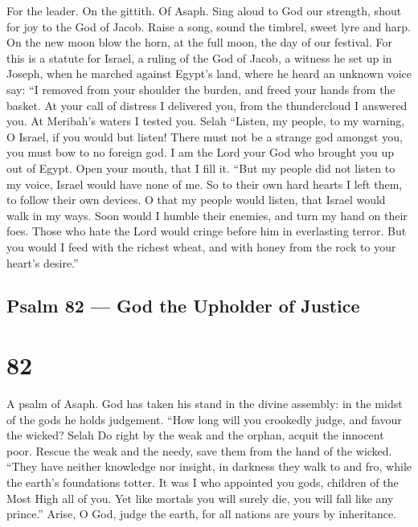 For the leader. On the gittith. Of Asaph.  Sing aloud to God
our strength, shout for joy to the God of Jacob.  Raise a
song, sound the timbrel, sweet lyre and harp.  On the new
moon blow the horn, at the full moon, the day of our festival.
 For this is a statute for Israel, a ruling of the God of
Jacob,  a witness he set up in Joseph, when he marched
against Egypt's land, where he heard an unknown voice say: 
``I removed from your shoulder the burden, and freed your hands from the
basket.  At your call of distress I delivered you, from the
thundercloud I answered you. At Meribah's waters I tested you. Selah
 ``Listen, my people, to my warning, O Israel, if you would
but listen!  There must not be a strange god amongst you,
you must bow to no foreign god.  I am the Lord your God who
brought you up out of Egypt. Open your mouth, that I fill it.
 ``But my people did not listen to my voice, Israel would
have none of me.  So to their own hard hearts I left them,
to follow their own devices.  O that my people would
listen, that Israel would walk in my ways.  Soon would I
humble their enemies, and turn my hand on their foes. 
Those who hate the Lord would cringe before him in everlasting terror.
 But you would I feed with the richest wheat, and with
honey from the rock to your heart's desire.''

\hypertarget{psalm-82-god-the-upholder-of-justice}{%
\subsection{Psalm 82 --- God the Upholder of
Justice}\label{psalm-82-god-the-upholder-of-justice}}

\hypertarget{section-81}{%
\section{82}\label{section-81}}

A psalm of Asaph.  God has taken his stand in the divine
assembly: in the midst of the gods he holds judgement. 
``How long will you crookedly judge, and favour the wicked? Selah
 Do right by the weak and the orphan, acquit the innocent
poor.  Rescue the weak and the needy, save them from the
hand of the wicked.  ``They have neither knowledge nor
insight, in darkness they walk to and fro, while the earth's foundations
totter.  It was I who appointed you gods, children of the
Most High all of you.  Yet like mortals you will surely die,
you will fall like any prince.''  Arise, O God, judge the
earth, for all nations are yours by inheritance.

